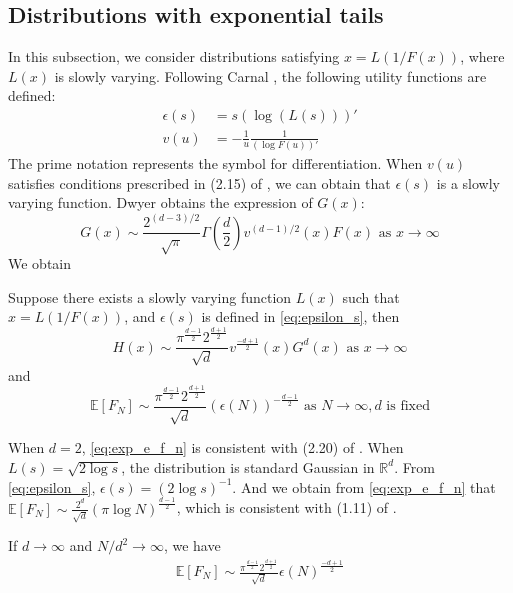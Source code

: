 \documentclass{aptpub}
\def\E{\mathbb{E}}
\def\R{\mathbb{R}}
\begin{document}
\subsection{Distributions with exponential tails}
In this subsection, we consider distributions satisfying
$x = L(1/F(x)) $, where $L(x)$ is slowly varying. Following Carnal \cite{carnal1970konvexe},
the following utility functions are defined:
\begin{align}
     \epsilon(s) & = s (\log (L(s)))' \label{eq:epsilon_s}\\
     v(u) &= -\frac{1}{u} \frac{1}{(\log F(u))'}    
\end{align}
The prime notation represents the symbol for differentiation. When $v(u)$ satisfies
conditions prescribed in (2.15) of \cite{carnal1970konvexe},
we can obtain that $\epsilon(s)$ is a slowly varying function.
Dwyer \cite{dwyer1991convex} obtains the expression of $G(x)$:
\begin{equation}\label{eq:G_x_exp}
     G(x) \sim \frac{2^{(d-3)/2}}{\sqrt{\pi}}\Gamma\left(\frac{d}{2}\right)
     v^{(d-1)/2}(x) F(x)
      \textrm{ as } x\to \infty
\end{equation}
We obtain
\begin{theorem}
     Suppose there exists a slowly
     varying function $L(x)$ such that $x=L(1/F(x))$,
     and $\epsilon(s)$ is defined in \eqref{eq:epsilon_s}, then
\begin{equation}\label{eq:H_x_exp}
     H(x) \sim \frac{\pi^{\frac{d-1}{2}} 2^{\frac{d+1}{2}}}{\sqrt{d}}v^{\frac{-d+1}{2}}(x)G^d(x)
     \textrm{ as } x\to \infty
\end{equation}
 and
 \begin{equation}\label{eq:exp_e_f_n}
     \E[F_N]\sim \frac{\pi^{\frac{d-1}{2}} 2^{\frac{d+1}{2}}}{\sqrt{d}} (\epsilon(N))^{-\frac{d-1}{2}}
     \textrm{ as } N \to \infty, d \textrm { is fixed}
 \end{equation}
\end{theorem}
 When $d=2$, \eqref{eq:exp_e_f_n} is consistent with (2.20) of \cite{carnal1970konvexe}.
 When $L(s)=\sqrt{2\log s}$, the distribution is standard Gaussian in $\R^d$.
 From \eqref{eq:epsilon_s}, $\epsilon(s) = (2\log s)^{-1}$. And we obtain from \eqref{eq:exp_e_f_n}
 that $\E[F_N]\sim \frac{2^d}{\sqrt{d}}(\pi \log N)^{\frac{d-1}{2}}$,
 which is consistent with (1.11) of \cite{raynaud1970enveloppe}.

 If $d\to\infty$ and $N/d^2\to \infty$, we have
\begin{align}\label{eq:d_infty_exp_E_F_N}
      \E[F_N]\sim \frac{\pi^{\frac{d-1}{2}} 2^{\frac{d+1}{2}}}{\sqrt{d}} \epsilon(N)^{\frac{-d+1}{2}}
\end{align}
\end{document}
